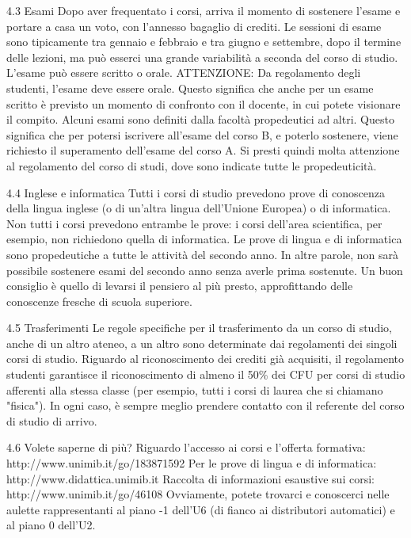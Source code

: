 4.3 Esami 
Dopo aver frequentato i corsi, arriva il momento di sostenere l'esame e portare a casa un voto, con l'annesso bagaglio di crediti. Le sessioni di esame sono tipicamente tra gennaio e febbraio e tra giugno e settembre, dopo il termine delle lezioni, ma può esserci una grande variabilità a seconda del corso di studio. L'esame può essere scritto o orale. 
ATTENZIONE: Da regolamento degli studenti, l'esame deve essere orale. Questo significa che anche per un esame scritto è previsto un momento di confronto con il docente, in cui potete visionare il compito. 
Alcuni esami sono definiti dalla facoltà propedeutici ad altri. Questo significa che per potersi iscrivere all'esame del corso B, e poterlo sostenere, viene richiesto il superamento dell'esame del corso A. Si presti quindi molta attenzione al regolamento del corso di studi, dove sono indicate tutte le propedeuticità.

4.4 Inglese e informatica 
Tutti i corsi di studio prevedono prove di conoscenza della lingua inglese (o di un'altra lingua dell'Unione Europea) o di informatica. Non tutti i corsi prevedono entrambe le prove: i corsi dell'area scientifica, per esempio, non richiedono quella di informatica. Le prove di lingua e di informatica sono propedeutiche a tutte le attività del secondo anno. In altre parole, non sarà possibile sostenere esami del secondo anno senza averle prima sostenute. Un buon consiglio è quello di levarsi il pensiero al più presto, approfittando delle conoscenze fresche di scuola superiore. 

4.5 Trasferimenti 
Le regole specifiche per il trasferimento da un corso di studio, anche di un altro ateneo, a un altro sono determinate dai regolamenti dei singoli corsi di studio. Riguardo al riconoscimento dei crediti già acquisiti, il regolamento studenti garantisce il riconoscimento di almeno il 50\% dei CFU per corsi di studio afferenti alla stessa classe (per esempio, tutti i corsi di laurea che si chiamano "fisica"). In ogni caso, è  sempre meglio prendere contatto con il referente del corso di studio di arrivo. 

4.6 Volete saperne di più? 
Riguardo l'accesso ai corsi e l'offerta formativa: http://www.unimib.it/go/183871592 
Per le prove di lingua e di informatica: http://www.didattica.unimib.it 
Raccolta di informazioni esaustive sui corsi: http://www.unimib.it/go/46108 
Ovviamente, potete trovarci e conoscerci nelle aulette rappresentanti al piano -1 dell'U6 (di fianco ai distributori automatici) e al piano 0 dell'U2. 
